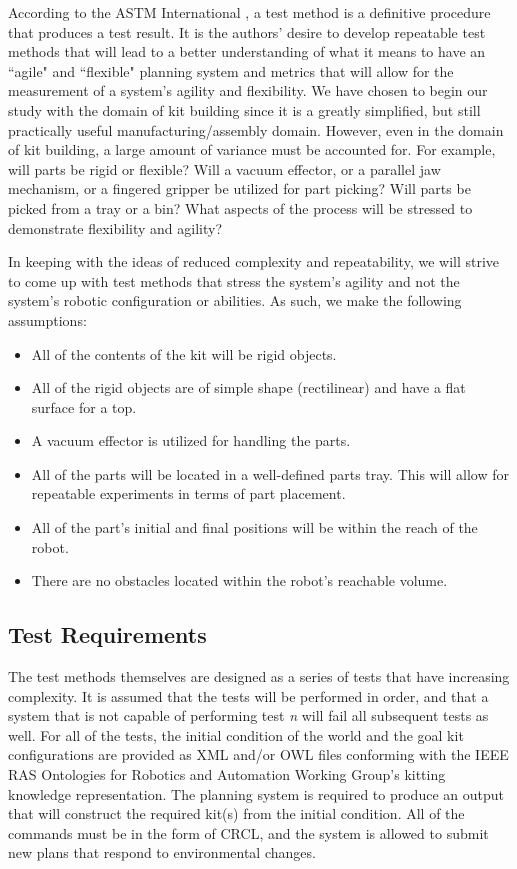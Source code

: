 According to the ASTM International \cite[p. vii]{ASTM99}, a test method is a
definitive procedure that produces a test result. It is the authors' desire to develop repeatable test methods that will
lead to a better understanding of what it means to have an ``agile" and ``flexible" planning system and metrics that
will allow for the measurement of a system's agility and flexibility. We have chosen to begin our study
with the domain of kit building since it is a greatly simplified, but still practically useful manufacturing/assembly domain. However,
even in the domain of kit building, a large amount of variance  must be accounted for. For
example, will parts be rigid or flexible? Will a vacuum effector, or a parallel jaw mechanism, or a fingered
gripper be utilized for part picking? Will parts be picked from a tray or a bin? What aspects of the
process will be stressed to demonstrate flexibility and agility?

In keeping with the ideas of reduced complexity and repeatability, we will strive to come up with test methods that stress
the system's agility and not the system's robotic configuration or abilities. As such, we make the following assumptions:
\begin{itemize}
	\item All of the contents of the kit will be rigid objects.
	\item All of the rigid objects are of simple shape (rectilinear) and have a flat surface for a top.
	\item A vacuum effector is utilized for handling the parts.
	\item All of the parts will be located in a well-defined parts tray. This will allow for repeatable experiments in terms of part placement.
	\item All of the part's initial and final positions will be within the reach of the robot.
	\item There are no obstacles located within the robot's reachable volume.
\end{itemize}

\subsection{Test Requirements}
The test methods themselves are designed as a series of tests that have increasing complexity. It is assumed that the tests will be performed
in order, and that a system that is not capable of performing test {\it n} will fail all subsequent tests as well. For all of the tests,
the initial condition of the world and the goal kit configurations are provided as XML and/or OWL files conforming with the IEEE RAS Ontologies
for Robotics and Automation Working Group's kitting knowledge representation. The planning system is required to produce an output that
will construct the required kit(s) from the initial condition. All of the commands must be in the form of CRCL, and the system
is allowed to submit new plans that respond to environmental changes.


